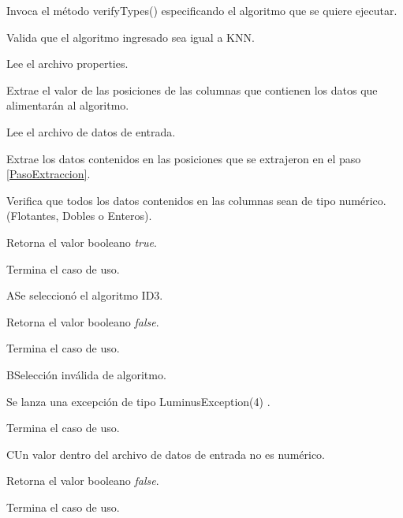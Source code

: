 	\begin{UCtrayectoria}

		\UCpaso[\UCactor] Invoca el método verifyTypes() especificando el algoritmo que se quiere ejecutar.

		\UCpaso[\UCsist] Valida que el algoritmo ingresado sea igual a KNN.  

		\UCpaso[\UCsist] Lee el archivo properties.

		\UCpaso[\UCsist] Extrae el valor de las posiciones de las columnas que contienen los datos que alimentarán al algoritmo. \label{PasoExtraccion}

		\UCpaso[\UCsist] Lee el archivo de datos de entrada.

		\UCpaso[\UCsist] Extrae los datos contenidos en las posiciones que se extrajeron en el paso \ref{PasoExtraccion}.

		\UCpaso[\UCsist] Verifica que todos los datos contenidos en las columnas sean de tipo numérico. (Flotantes, Dobles o Enteros). 

		\UCpaso[\UCsist] Retorna el valor booleano \emph{true}.

		\UCpaso[] Termina el caso de uso.

	\end{UCtrayectoria}




	\begin{UCtrayectoriaA}{A}{Se seleccionó el algoritmo ID3.}

		\UCpaso[\UCsist] Retorna el valor booleano \emph{false}.

		\UCpaso[] Termina el caso de uso.

	\end{UCtrayectoriaA}


	\begin{UCtrayectoriaA}{B}{Selección inválida de algoritmo.}

		\UCpaso[\UCsist] Se lanza una excepción de tipo LuminusException(4) .

		\UCpaso[] Termina el caso de uso.

	\end{UCtrayectoriaA}


	\begin{UCtrayectoriaA}{C}{Un valor dentro del archivo de datos de entrada no es numérico.}

		\UCpaso[\UCsist] Retorna el valor booleano \emph{false}.

		\UCpaso[] Termina el caso de uso.

	\end{UCtrayectoriaA}
